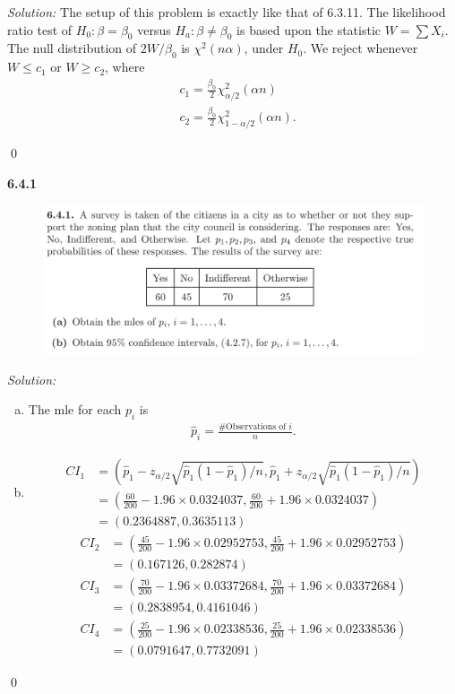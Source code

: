 \documentclass{book}
\theoremstyle{definition}
\newcommand{\nn}{\nonumber}
\newcommand{\al}{\alpha}
\newcommand{\f}[2]{\frac{#1}{#2}}
\newcommand{\lp}{\left(}
\newcommand{\rp}{\right)}
\begin{document}
\noindent \textit{Solution:} The setup of this problem is exactly like that of 6.3.11. The likelihood ratio test of $H_0 : \beta = \beta_0$ versus $H_a : \beta \neq \beta_0$ is based upon the statistic $W = \sum X_i $. The null distribution of $2W/\beta_0$ is $\chi^2(n\al)$, under $H_0$. We reject whenever $W \leq c_1$ or $W \geq c_2$, where 
\begin{align}
&c_1 = \f{\beta_0}{2}\chi^2_{\al/2}(\al n) \nn\\
&c_2 = \f{\beta_0}{2}\chi^2_{1-\al/2}(\al n). 
\end{align}

\qed


\newpage
\noindent \textbf{6.4.1}
\begin{figure}[!htb]
	\centering
	\includegraphics[scale=0.6]{641}
\end{figure}


\noindent \textit{Solution:} 
\begin{enumerate}[(a)]
	\item The mle for each $p_i$ is 
	\begin{align}
	\hat{p}_i = \f{\mbox{\# Observations of $i$}}{n}.
	\end{align}
	
	\item 
	\begin{align}
	CI_1 &= \lp \hat{p}_1 - z_{\al/2}\sqrt{\hat{p}_1(1-\hat{p}_1)/n}, \hat{p}_1 + z_{\al/2}\sqrt{\hat{p}_1(1-\hat{p}_1)/n} \rp \nn\\
	&= \lp \f{60}{200} - 1.96\times 0.0324037 , \f{60}{200} + 1.96\times 0.0324037  \rp\nn\\ 
	&= \boxed{(0.2364887, 0.3635113)}
	\end{align}
	\begin{align}
	CI_2 
	&= \lp \f{45}{200} - 1.96\times 0.02952753 , \f{45}{200} + 1.96\times 0.02952753  \rp\nn\\ 
	&= \boxed{(0.167126, 0.282874)}
	\end{align}
	\begin{align}
	CI_3
	&= \lp \f{70}{200} - 1.96\times 0.03372684 , \f{70}{200} + 1.96\times 0.03372684  \rp\nn\\ 
	&= \boxed{(0.2838954, 0.4161046)}
	\end{align}
	\begin{align}
	CI_4 
	&= \lp \f{25}{200} - 1.96\times 0.02338536  , \f{25}{200} + 1.96\times 0.02338536  \rp\nn\\ 
	&= \boxed{(0.0791647, 0.7732091)}
	\end{align}
	
\end{enumerate}\qed
\end{document}
